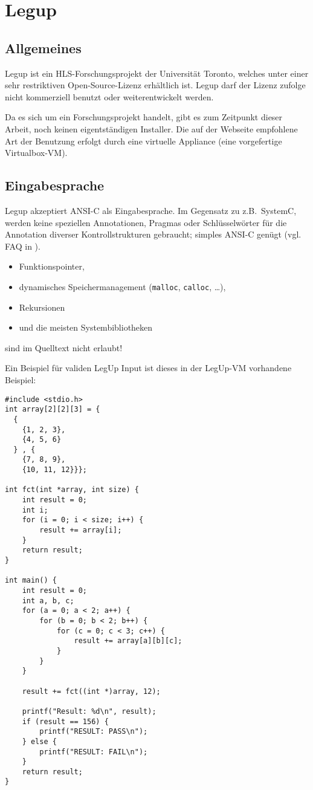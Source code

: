 \documentclass[oneside,a4paper]{article}
\def\C#1{\lstinline[style=c]{#1}}
\begin{document}
\section{Legup}
\subsection{Allgemeines}
Legup ist ein HLS-Forschungsprojekt der Universität Toronto, welches
unter einer sehr restriktiven Open-Source-Lizenz erhältlich ist.
Legup darf der Lizenz zufolge nicht kommerziell benutzt oder
weiterentwickelt werden.

Da es sich um ein Forschungsprojekt handelt, gibt es zum Zeitpunkt dieser
Arbeit, noch keinen eigentständigen Installer. Die auf der Webseite
empfohlene Art der Benutzung erfolgt durch eine virtuelle Appliance (eine
vorgefertige Virtualbox-VM).

\subsection{Eingabesprache}
Legup akzeptiert ANSI-C als Eingabesprache. Im Gegensatz zu z.B.\
SystemC, werden keine speziellen Annotationen, Pragmas oder Schlüsselwörter
für die Annotation diverser Kontrollstrukturen gebraucht; simples ANSI-C
genügt (vgl. FAQ in \cite{LEGUP}).

\begin{itemize}
  \item Funktionspointer,
  \item dynamisches Speichermanagement (\C{malloc}, \C{calloc}, \ldots),
  \item Rekursionen
  \item und die meisten Systembibliotheken
\end{itemize}
sind im Quelltext nicht erlaubt!

Ein Beispiel für validen LegUp Input ist dieses in der LegUp-VM
vorhandene Beispiel:
\begin{lstlisting}[style=c,caption={Synthetisierbare Arrayverarbeitung},label=array]
#include <stdio.h>
int array[2][2][3] = {
  {
    {1, 2, 3},
    {4, 5, 6}
  } , {
    {7, 8, 9},
    {10, 11, 12}}};

int fct(int *array, int size) {
    int result = 0;
    int i;
    for (i = 0; i < size; i++) {
        result += array[i];
    }
    return result;
}

int main() {
    int result = 0;
    int a, b, c;
    for (a = 0; a < 2; a++) {
        for (b = 0; b < 2; b++) {
            for (c = 0; c < 3; c++) {
                result += array[a][b][c];
            }
        }
    }

    result += fct((int *)array, 12);

    printf("Result: %d\n", result);
    if (result == 156) {
        printf("RESULT: PASS\n");
    } else {
        printf("RESULT: FAIL\n");
    }
    return result;
}
\end{lstlisting}
\end{document}
